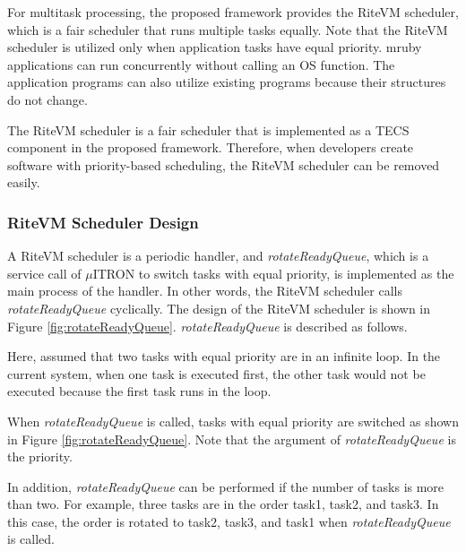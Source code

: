 \documentclass[S,R,E]{article/compsoft}
\begin{document}
For multitask processing, the proposed framework provides the RiteVM scheduler, which is a fair scheduler that runs multiple tasks equally.
Note that the RiteVM scheduler is utilized only when application tasks have equal priority.
mruby applications can run concurrently without calling an OS function.
The application programs can also utilize existing programs because their structures do not change.

The RiteVM scheduler is a fair scheduler that is implemented as a TECS component in the proposed framework.
Therefore, when developers create software with priority-based scheduling, the RiteVM scheduler can be removed easily.


\subsubsection{RiteVM Scheduler Design}
A RiteVM scheduler is a periodic handler, and {\it rotateReadyQueue}, which is a service call of $\mu$ITRON to switch tasks with equal priority, is implemented as the main process of the handler.
In other words, the RiteVM scheduler calls {\it rotateReadyQueue} cyclically.
The design of the RiteVM scheduler is shown in Figure \ref{fig:rotateReadyQueue}. 
{\it rotateReadyQueue} is described as follows.

Here, assumed that two tasks with equal priority are in an infinite loop.
In the current system, when one task is executed first, the other task would not be executed because the first task runs in the loop.

When {\it rotateReadyQueue} is called, tasks with equal priority are switched as shown in Figure \ref{fig:rotateReadyQueue}.
Note that the argument of {\it rotateReadyQueue} is the priority.

In addition, {\it rotateReadyQueue} can be performed if the number of tasks is more than two.
For example, three tasks are in the order task1, task2, and task3.
In this case, the order is rotated to task2, task3, and task1 when {\it rotateReadyQueue} is called.
\end{document}
